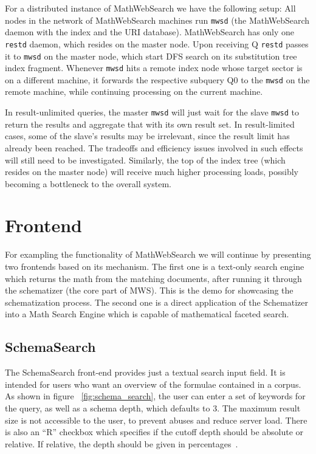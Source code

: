 \documentclass{deliverablereport}
\def\MWS{\textsf{MathWebSearch}\xspace}
\begin{document}
For a distributed instance of \MWS we have the following setup: All nodes in the network
of \MWS machines run \texttt{mwsd} (the \MWS daemon with the index and the URI
database). \MWS has only one \texttt{restd} daemon, which resides on the master node. Upon
receiving Q \texttt{restd} passes it to \texttt{mwsd} on the master node, which start DFS
search on its substitution tree index fragment. Whenever \texttt{mwsd} hits a remote index
node whose target sector is on a different machine, it forwards the respective subquery Q0
to the \texttt{mwsd} on the remote machine, while continuing processing on the current
machine.

In result-unlimited queries, the master \texttt{mwsd} will just wait for the slave
\texttt{mwsd} to return the results and aggregate that with its own result set. In
result-limited cases, some of the slave’s results may be irrelevant, since the result
limit has already been reached. The tradeoffs and efficiency issues involved in such
effects will still need to be investigated. Similarly, the top of the index tree (which
resides on the master node) will receive much higher processing loads, possibly becoming a
bottleneck to the overall system.


\section{Frontend}\label{frontend}
For exampling the functionality of \MWS we will continue by presenting two frontends based
on its mechanism. The first one is a text-only search engine which returns the math from
the matching documents, after running it through the schematizer (the core part of
MWS). This is the demo for showcasing the schematization process. The second one is a
direct application of the Schematizer into a Math Search Engine which is capable of
mathematical faceted search.~\cite{HamKoh:fsfm15}

\subsection{SchemaSearch}\label{shcemasearch}
The SchemaSearch front-end provides just a textual search input field. It is intended for
users who want an overview of the formulae contained in a corpus. As shown in figure
~\ref{fig:schema_search}, the user can enter a set of keywords for the query, as well as a
schema depth, which defaults to 3. The maximum result size is not accessible to the user,
to prevent abuses and reduce server load. There is also an “R” checkbox which specifies if
the cutoff depth should be absolute or relative. If relative, the depth should be given in
percentages~\cite{Ham:bcs15}.
\end{document}
